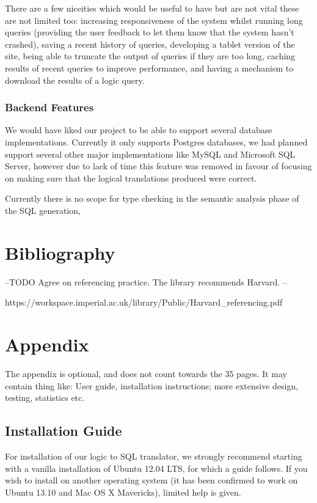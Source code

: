 \documentclass[a4paper, 11pt]{article}
\begin{document}
    There are a few niceities which would be useful to have but are not vital
    these are not limited too: increasing responsiveness of the system whilst 
    running long queries (providing the user feedback to let them know that the
    system hasn't crashed), saving a recent history of queries, developing a 
    tablet version of the site, being able to truncate the output of queries if 
    they are too long, caching results of recent queries to improve performance,
    and having a mechanism to download the results of a logic query.  

    
    \subsubsection{Backend Features} 
    We would have liked our project to be able to support several database
    implementations. Currently it only supports Postgres databases, we had
    planned support several other major implementations like MySQL and
    Microsoft SQL Server, however due to lack of time this feature was removed
    in favour of focusing on making sure that the logical translations produced
    were correct. 
   
    Currently there is no scope for type checking in the semantic analysis phase
    of the SQL generation,

   
    

\section{Bibliography}
  \printbibliography

  --TODO Agree on referencing practice. The library recommends Harvard. --

  https://workspace.imperial.ac.uk/library/Public/Harvard\_referencing.pdf

\appendix
\section{Appendix}
  The appendix is optional, and does not count towards the 35 pages. It may
  contain thing like: User guide, installation instructions; more extensive
  design, testing, statistics etc.

  \subsection{Installation Guide}
    For installation of our logic to SQL translator, we strongly recommend
    starting with a vanilla installation of Ubuntu 12.04 LTS, for which a guide
    follows. If you wish to install on another operating system (it has been 
    confirmed to work on Ubuntu 13.10 and Mac OS X Mavericks),
    limited help is given.
\end{document}
